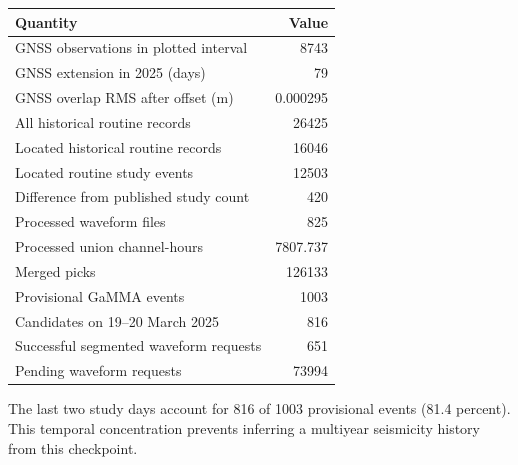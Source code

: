 \begin{longtable}{p{.70\linewidth}r}\toprule Quantity & Value\\\midrule\endhead
GNSS observations in plotted interval & 8743\\
GNSS extension in 2025 (days) & 79\\
GNSS overlap RMS after offset (m) & 0.000295\\
All historical routine records & 26425\\
Located historical routine records & 16046\\
Located routine study events & 12503\\
Difference from published study count & 420\\
Processed waveform files & 825\\
Processed union channel-hours & 7807.737\\
Merged picks & 126133\\
Provisional GaMMA events & 1003\\
Candidates on 19--20 March 2025 & 816\\
Successful segmented waveform requests & 651\\
Pending waveform requests & 73994\\
\bottomrule\end{longtable}
The last two study days account for 816 of 1003 provisional events (81.4 percent). This temporal concentration prevents inferring a multiyear seismicity history from this checkpoint.

